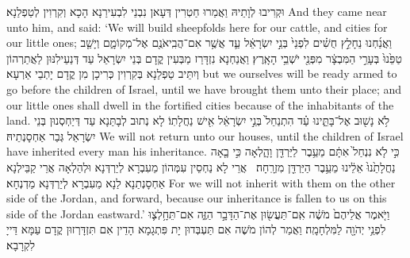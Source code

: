 {וּקְרִיבוּ לְוָתֵיהּ וַאֲמַרוּ חַטְרִין דְּעָאן נִבְנֵי לִבְעִירַנָא הָכָא וְקִרְוִין לְטַפְלַנָא׃}
{And they came near unto him, and said: ‘We will build sheepfolds here for our cattle, and cities for our little ones;}{}
{וַאֲנַ֜חְנוּ נֵחָלֵ֣ץ חֻשִׁ֗ים לִפְנֵי֙ בְּנֵ֣י יִשְׂרָאֵ֔ל עַ֛ד אֲשֶׁ֥ר אִם־הֲבִֽיאֹנֻ֖ם אֶל־מְקוֹמָ֑ם וְיָשַׁ֤ב טַפֵּ֙נוּ֙ בְּעָרֵ֣י הַמִּבְצָ֔ר מִפְּנֵ֖י יֹשְׁבֵ֥י הָאָֽרֶץ׃
}
{וַאֲנַחְנָא נִזְדָּרַז מַבְּעִין קֳדָם בְּנֵי יִשְׂרָאֵל עַד דְּנַעֵילִנּוּן לַאֲתַרְהוֹן וְיִתֵּיב טַפְלַנָא בְּקִרְוִין כְּרִיכָן מִן קֳדָם יָתְבֵי אַרְעָא׃}
{but we ourselves will be ready armed to go before the children of Israel, until we have brought them unto their place; and our little ones shall dwell in the fortified cities because of the inhabitants of the land.}{}
{לֹ֥א נָשׁ֖וּב אֶל־בָּתֵּ֑ינוּ עַ֗ד הִתְנַחֵל֙ בְּנֵ֣י יִשְׂרָאֵ֔ל אִ֖ישׁ נַחֲלָתֽוֹ׃}
{לָא נְתוּב לְבָתַּנָא עַד דְּיַחְסְנוּן בְּנֵי יִשְׂרָאֵל גְּבַר אַחְסָנְתֵיהּ׃}
{We will not return unto our houses, until the children of Israel have inherited every man his inheritance.}{}
{כִּ֣י לֹ֤א נִנְחַל֙ אִתָּ֔ם מֵעֵ֥בֶר לַיַּרְדֵּ֖ן וָהָ֑לְאָה כִּ֣י בָ֤אָה נַחֲלָתֵ֙נוּ֙ אֵלֵ֔ינוּ מֵעֵ֥בֶר הַיַּרְדֵּ֖ן מִזְרָֽחָה׃ \petucha 
{}}
{אֲרֵי לָא נַחְסֵין עִמְּהוֹן מֵעִבְרָא לְיַרְדְּנָא וּלְהַלְאָה אֲרֵי קַבֵּילְנָא אַחְסָנְתַנָא לַנָא מֵעִבְרָא לְיַרְדְּנָא מַדְנְחָא׃}
{For we will not inherit with them on the other side of the Jordan, and forward, because our inheritance is fallen to us on this side of the Jordan eastward.’}{}
{וַיֹּ֤אמֶר אֲלֵיהֶם֙ מֹשֶׁ֔ה אִֽם־תַּעֲשׂ֖וּן אֶת־הַדָּבָ֣ר הַזֶּ֑ה אִם־תֵּחָ֥לְצ֛וּ לִפְנֵ֥י יְהֹוָ֖ה לַמִּלְחָמָֽה׃}
{וַאֲמַר לְהוֹן מֹשֶׁה אִם תַּעְבְּדוּן יָת פִּתְגָמָא הָדֵין אִם תִּזְדָּרְזוּן קֳדָם עַמָּא דַּייָ לִקְרָבָא׃}
